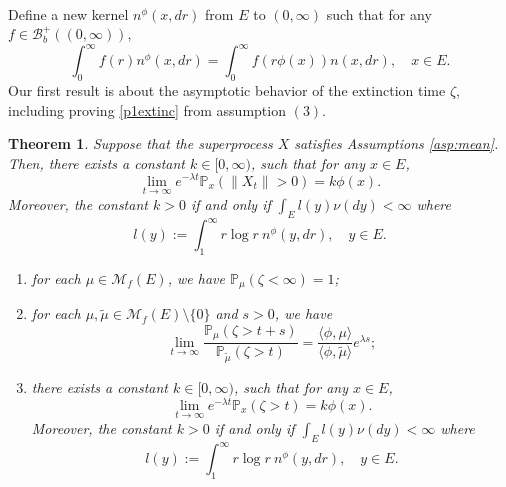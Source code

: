 \documentclass[12pt,a4paper]{amsart}
\numberwithin{equation}{section}
\theoremstyle{plain}
\newtheorem{thm}{Theorem}[section]
\theoremstyle{definition}
\theoremstyle{remark}
\begin{document}
\hspace*{10pt}\\
Define a new kernel $n^\phi(x, dr)$ from $E$ to $(0,\infty)$ such that for any $f\in\mathcal B_b^+((0,\infty))$,
\begin{equation} \label{phi-change}
	\int_0^\infty f(r)n^\phi(x,dr)=\int_0^\infty f(r\phi(x))n(x, dr),
	\quad x\in E.
\end{equation}
{\color{gray}
	Our first result is about the asymptotic behavior of the extinction time $\zeta$, including proving \eqref{p1extinc} from assumption $(3)$. 
}
\begin{thm}\label{thm:E}
	Suppose that the superprocess $X$ satisfies Assumptions \ref{asp:mean}. Then,
	there exists a constant $k\in [0,\infty)$, such that for any $x\in E$,
	\begin{equation}\label{decay rate}
	\lim_{t\rightarrow\infty} e^{-\lambda t}\mathbb P_x(\|X_t\|>0)=k\phi(x).
	\end{equation}
	Moreover, the constant $k>0$ if and only if $\int_E l(y)\nu(dy)<\infty$ where
	\begin{equation}\label{def: m}
	l(y):=\int_1^\infty r\log r~n^\phi(y, dr),\quad y \in E.
	\end{equation}
{\color{gray}
\begin{enumerate}
\item \label{subthm: extinct as sure}
	for each $\mu \in \mathcal M_f(E)$, we have  $\mathbb P_\mu(\zeta<\infty)=1$;
\item
 	for each $\mu,\tilde\mu\in \mathcal M_f(E)\setminus\{0\}$ and $s>0$, we have
 \[
 	\lim_{t\rightarrow\infty}\dfrac{\mathbb P_{\mu}(\zeta>t+s)}{\mathbb P_{\tilde\mu}(\zeta>t)}=\frac{\langle \phi,\mu\rangle }{\langle \phi,\tilde\mu\rangle }e^{\lambda s};
 \]
 \item
 	there exists a constant $k\in [0,\infty)$, such that for any $x\in E$,
\begin{equation}\label{decay rate}
	\lim_{t\rightarrow\infty} e^{-\lambda t}\mathbb P_x(\zeta>t)=k\phi(x).
\end{equation}
	Moreover, the constant $k>0$ if and only if $\int_E l(y)\nu(dy)<\infty$ where
\begin{equation}\label{def: m}
	l(y):=\int_1^\infty r\log r~n^\phi(y, dr),\quad y \in E.
\end{equation}
\end{enumerate}
}
\end{thm}
\end{document}
